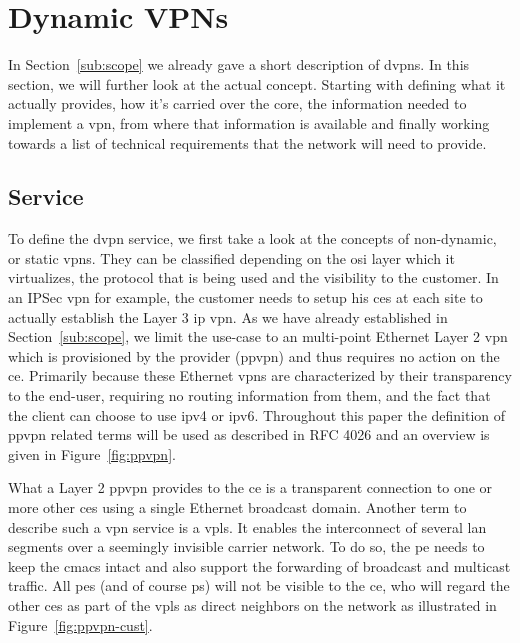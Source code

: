 \section{Dynamic VPNs} %
\label{sec:dvpns}

In Section~\ref{sub:scope} we already gave a short description of \acp{dvpn}. In this section, we will further look at the actual concept. Starting with defining what it actually provides, how it's carried over the core, the information needed to implement a \ac{vpn}, from where that information is available and finally working towards a list of technical requirements that the network will need to provide.

\subsection{Service} %
\label{sub:service}

To define the \ac{dvpn} service, we first take a look at the concepts of non-dynamic, or static \acp{vpn}. They can be classified depending on the \acs{osi} layer which it virtualizes, the protocol that is being used and the visibility to the customer. In an IPSec \ac{vpn} for example, the customer needs to setup his \acp{ce} at each site to actually establish the Layer 3 \acs{ip} \ac{vpn}. As we have already established in Section~\ref{sub:scope}, we limit the use-case to an multi-point Ethernet Layer 2 \ac{vpn} which is provisioned by the provider (\acs{ppvpn}) and thus requires no action on the \ac{ce}. Primarily because these Ethernet \acp{vpn} are characterized by their transparency to the end-user, requiring no routing information from them, and the fact that the client can choose to use \acs{ip}v4 or \acs{ip}v6. Throughout this paper the definition of \ac{ppvpn} related terms will be used as described in RFC 4026 \cite{vpn-terms} and an overview is given in Figure~\ref{fig:ppvpn}.

What a Layer 2 \ac{ppvpn} provides to the \ac{ce} is a transparent connection to one or more other \acp{ce} using a single Ethernet broadcast domain. Another term to describe such a \ac{vpn} service is a \ac{vpls}. It enables the interconnect of several \acs{lan} segments over a seemingly invisible carrier network. To do so, the \ac{pe} needs to keep the \acp{cmac} intact and also support the forwarding of broadcast and multicast traffic. All \acp{pe} (and of course \acp{p}) will not be visible to the \ac{ce}, who will regard the other \acp{ce} as part of the \ac{vpls} as direct neighbors on the network as illustrated in Figure~\ref{fig:ppvpn-cust}. 

